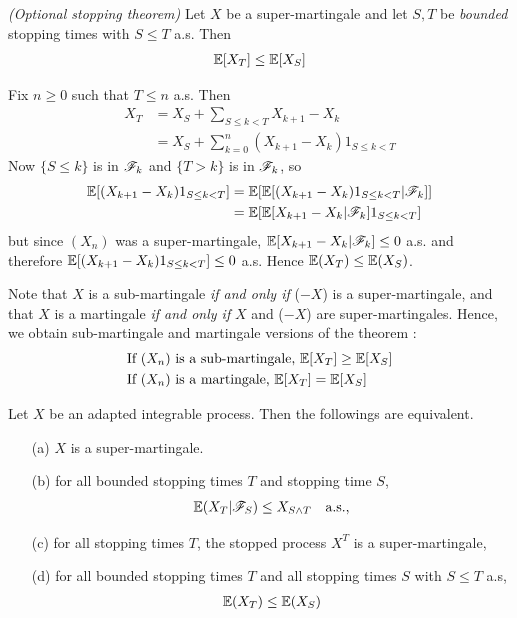 \documentclass[10pt,a4paper]{report}
\newenvironment{proof}
{\begin{changemargin}{1cm}{0.5cm} 
	}%
	{\end{changemargin}
}
\begin{document}
 \emph{(Optional stopping theorem)} Let $X$ be a super-martingale and let $S,T$ be \emph{bounded} stopping times with $S \leq T$ a.s. Then
\begin{align*}
\mathbb{E}[X_T] \leq \mathbb{E}[X_S]
\end{align*}
\begin{proof}
\pf Fix $n\geq 0$ such that $T\leq n$ a.s. Then
\begin{align*}
X_T &= X_S + \sum_{S\leq k <T} X_{k+1} - X_k  \\
&= X_S + \sum_{k=0}^n (X_{k+1} - X_k) 1_{S\leq k <T}
\end{align*}
Now $\{S\leq k\}$ is in $\mathscr{F}_k$ and $\{T>k\}$ is in $\mathscr{F}_k$, so
\begin{align*}
\mathbb{E}[(X_{k+1} - X_k)1_{S\leq k <T}  ] &= \mathbb{E} [\mathbb{E}[ (X_{k+1} - X_k) 1_{S\leq k<T} |\mathscr{F}_k ]] \\
& = \mathbb{E}[ \mathbb{E} [  X_{k+1} -X_k | \mathscr{F}_k ] 1_{S\leq k < T} ]
\end{align*}
but since $(X_n)$ was a super-martingale,  $\mathbb{E} [  X_{k+1} -X_k | \mathscr{F}_k ] \leq 0$ a.s. and therefore $\mathbb{E}[(X_{k+1} - X_k)1_{S\leq k <T}  ] \leq 0$ a.s. Hence $\mathbb{E}(X_T) \leq \mathbb{E}(X_S)$.

\eop
\end{proof}
\s

\bull Note that $X$ is a sub-martingale \emph{if and only if} ($-X$) is a super-martingale, and that $X$ is a martingale \emph{if and only if} $X$ and ($-X$) are super-martingales. Hence, we obtain sub-martingale and martingale versions of the theorem :
\begin{align*}
&\text{If } (X_n) \text{ is a sub-martingale, } \mathbb{E}[X_T] \geq \mathbb{E}[X_S] \\
&\text{If } (X_n) \text{ is a martingale, } \mathbb{E}[X_T] = \mathbb{E}[X_S]
\end{align*}
\s

 Let $X$ be an adapted integrable process. Then the followings are equivalent.
\begin{itemize}
\item[(a)] $X$ is a super-martingale. 
\item[(b)] for all bounded stopping times $T$ and stopping time $S$,
\begin{align*}
\mathbb{E}(X_T |\mathscr{F}_S) \leq X_{S\wedge T} \quad \text{a.s.},
\end{align*}
\item[(c)] for all stopping times $T$, the stopped process $X^T$ is a super-martingale,
\item[(d)] for all bounded stopping times $T$ and all stopping times $S$ with $S\leq T$ a.s,
\begin{align*}
\mathbb{E}(X_T) \leq \mathbb{E}(X_S)
\end{align*}
\end{itemize}
\end{document}
